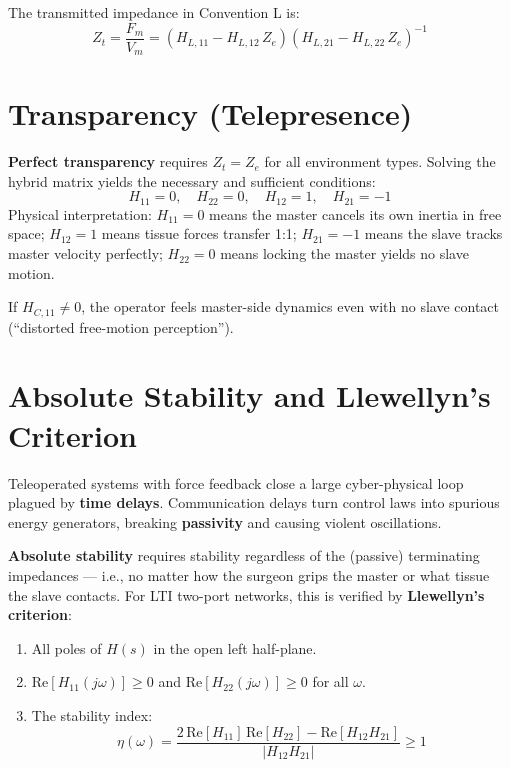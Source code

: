 \documentclass[11pt,a4paper,twoside]{report}
\begin{document}
The transmitted impedance in Convention L is:
\begin{equation}
    Z_t = \frac{F_m}{V_m} = (H_{L,11} - H_{L,12}\,Z_e)(H_{L,21} - H_{L,22}\,Z_e)^{-1}
\end{equation}

\section{Transparency (Telepresence)}
\textbf{Perfect transparency} requires $Z_t = Z_e$ for all environment types. Solving the hybrid matrix yields the necessary and sufficient conditions:
\begin{equation}
    H_{11} = 0, \quad H_{22} = 0, \quad H_{12} = 1, \quad H_{21} = -1
\end{equation}
Physical interpretation: $H_{11} = 0$ means the master cancels its own inertia in free space; $H_{12} = 1$ means tissue forces transfer 1:1; $H_{21} = -1$ means the slave tracks master velocity perfectly; $H_{22} = 0$ means locking the master yields no slave motion.

If $H_{C,11} \neq 0$, the operator feels master-side dynamics even with no slave contact (``distorted free-motion perception'').

\section{Absolute Stability and Llewellyn's Criterion}
Teleoperated systems with force feedback close a large cyber-physical loop plagued by \textbf{time delays}. Communication delays turn control laws into spurious energy generators, breaking \textbf{passivity} and causing violent oscillations.

\textbf{Absolute stability} requires stability regardless of the (passive) terminating impedances — i.e., no matter how the surgeon grips the master or what tissue the slave contacts. For LTI two-port networks, this is verified by \textbf{Llewellyn's criterion}:
\begin{enumerate}
    \item All poles of $H(s)$ in the open left half-plane.
    \item $\text{Re}[H_{11}(j\omega)] \geq 0$ and $\text{Re}[H_{22}(j\omega)] \geq 0$ for all $\omega$.
    \item The stability index:
    \begin{equation}
        \eta(\omega) = \frac{2\,\text{Re}[H_{11}]\,\text{Re}[H_{22}] - \text{Re}[H_{12}H_{21}]}{|H_{12}H_{21}|} \geq 1
    \end{equation}
\end{enumerate}
\end{document}
